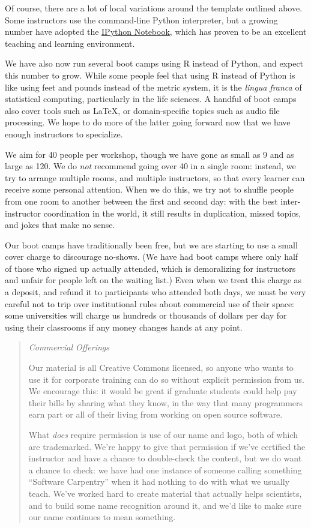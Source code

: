 \documentclass{article}
\begin{document}
Of course, there are a lot of local variations around the template
outlined above. Some instructors use the command-line Python
interpreter, but a growing number have adopted the
\href{http://ipython.org/notebook.html}{IPython Notebook}, which has
proven to be an excellent teaching and learning environment.

We have also now run several boot camps using R instead of Python, and
expect this number to grow. While some people feel that using R instead
of Python is like using feet and pounds instead of the metric system, it
is the \emph{lingua franca} of statistical computing, particularly in
the life sciences. A handful of boot camps also cover tools such as
LaTeX, or domain-specific topics such as audio file processing. We hope
to do more of the latter going forward now that we have enough
instructors to specialize.

We aim for 40 people per workshop, though we have gone as small as 9 and
as large as 120. We do \emph{not} recommend going over 40 in a single
room: instead, we try to arrange multiple rooms, and multiple
instructors, so that every learner can receive some personal attention.
When we do this, we try not to shuffle people from one room to another
between the first and second day: with the best inter-instructor
coordination in the world, it still results in duplication, missed
topics, and jokes that make no sense.

Our boot camps have traditionally been free, but we are starting to use
a small cover charge to discourage no-shows. (We have had boot camps
where only half of those who signed up actually attended, which is
demoralizing for instructors and unfair for people left on the waiting
list.) Even when we treat this charge as a deposit, and refund it to
participants who attended both days, we must be very careful not to trip
over institutional rules about commercial use of their space: some
universities will charge us hundreds or thousands of dollars per day for
using their classrooms if any money changes hands at any point.

\begin{quote}
\emph{Commercial Offerings}

Our material is all Creative Commons licensed, so anyone who wants to
use it for corporate training can do so without explicit permission from
us. We encourage this: it would be great if graduate students could help
pay their bills by sharing what they know, in the way that many
programmers earn part or all of their living from working on open source
software.

What \emph{does} require permission is use of our name and logo, both of
which are trademarked. We're happy to give that permission if we've
certified the instructor and have a chance to double-check the content,
but we do want a chance to check: we have had one instance of someone
calling something ``Software Carpentry'' when it had nothing to do with
what we usually teach. We've worked hard to create material that
actually helps scientists, and to build some name recognition around it,
and we'd like to make sure our name continues to mean something.
\end{quote}
\end{document}
